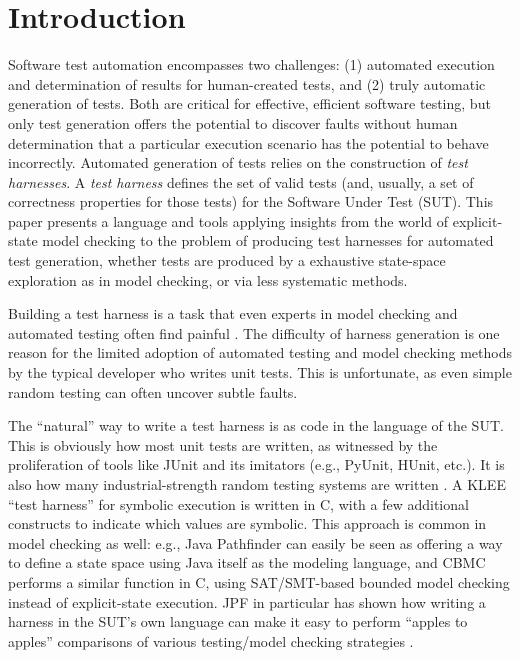 \section{Introduction}

Software test automation encompasses two challenges: (1) automated
execution and determination of results for human-created tests, and
(2) truly automatic generation of tests.  Both are critical for effective,
efficient software testing, but only test generation offers the
potential to discover faults without human determination that a
particular execution scenario has the potential to behave incorrectly.
Automated generation of tests relies on the construction of \emph{test
  harnesses}.  A \emph{test harness} defines the set of valid tests
(and, usually, a set of correctness properties for those tests) for
the Software Under Test (SUT).  This paper presents a language and
tools applying insights from the world of explicit-state model
checking to the problem of producing test harnesses for automated
test generation, whether tests are produced by a exhaustive
state-space exploration as in model checking, or via less
systematic methods.

Building a test harness is a task that even experts in
model checking and automated testing often find painful
\cite{woda08,woda12}.  The difficulty of harness generation is one
reason for the limited adoption of automated testing and model
checking methods by the typical developer who writes unit tests.  This is
unfortunate, as even simple random testing can often uncover subtle
faults.

The ``natural'' way to write a test harness is as code in the language
of the SUT.  This is obviously how most unit
tests are written, as witnessed by the proliferation of tools like
JUnit \cite{JUnit} and its imitators (e.g., PyUnit, HUnit, etc.).  It
is also how many industrial-strength random testing systems are
written \cite{ICSEDiff,AMAI}.  A KLEE ``test harness'' \cite{KLEE} for
symbolic execution is written in C, with a few additional constructs
to indicate which values are symbolic.  This approach is common in
model checking as well: e.g., Java Pathfinder \cite{JPF,JPF2} can
easily be seen as offering a way to define a state space using Java
itself as the modeling language, and CBMC \cite{CBMC,CBMCp} performs a
similar function in C, using SAT/SMT-based bounded model checking
instead of explicit-state execution.  JPF in particular has shown how
writing a harness in the SUT's own language can make it easy to
perform ``apples to apples'' comparisons of various testing/model
checking strategies \cite{JPFRandTest}.


